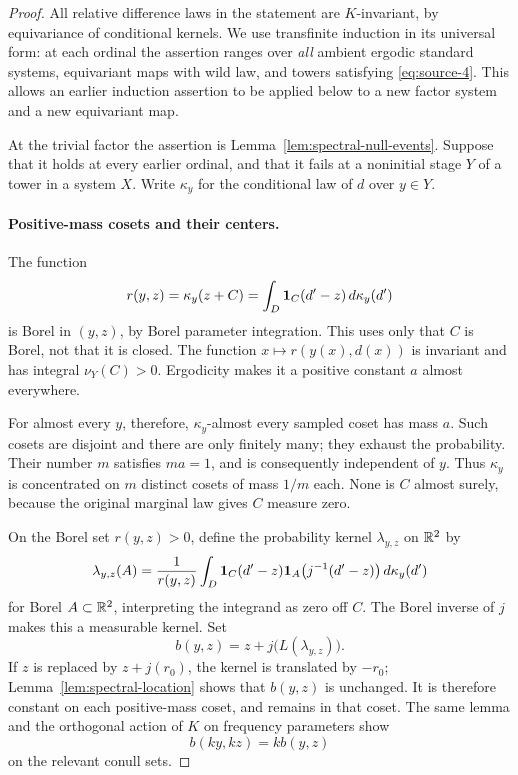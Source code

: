 \begin{proof}
All relative difference laws in the statement are $K$-invariant, by
equivariance of conditional kernels. We use transfinite induction in
its universal form: at each ordinal the assertion ranges over
\emph{all} ambient ergodic standard systems, equivariant maps with wild
law, and towers satisfying \eqref{eq:source-4}. This allows an earlier
induction assertion to be applied below to a new factor system and a
new equivariant map.

At the trivial factor the assertion is
Lemma~\ref{lem:spectral-null-events}. Suppose that it holds at every
earlier ordinal, and that it fails at a noninitial stage $Y$ of a tower
in a system $X$. Write $\kappa_y$ for the conditional law of $d$ over
$y\in Y$.

\paragraph{Positive-mass cosets and their centers.}
The function
\[
 r(y,z)=\kappa_y(z+C)
       =\int_D\mathbf 1_C(d'-z)\,d\kappa_y(d')
\]
is Borel in $(y,z)$, by Borel parameter integration. This uses only that
$C$ is Borel, not that it is closed. The function
$x\mapsto r(y(x),d(x))$ is invariant and has integral $\nu_Y(C)>0$.
Ergodicity makes it a positive constant $a$ almost everywhere.

For almost every $y$, therefore, $\kappa_y$-almost every sampled coset
has mass $a$. Such cosets are disjoint and there are only finitely many;
they exhaust the probability. Their number $m$ satisfies $ma=1$, and
is consequently independent of $y$. Thus $\kappa_y$ is concentrated
on $m$ distinct cosets of mass $1/m$ each. None is $C$ almost surely,
because the original marginal law gives $C$ measure zero.

On the Borel set $r(y,z)>0$, define the probability kernel
$\lambda_{y,z}$ on $\mathbb R^2$ by
\[
 \lambda_{y,z}(A)=\frac{1}{r(y,z)}
 \int_D\mathbf 1_C(d'-z)\mathbf 1_A\bigl(j^{-1}(d'-z)\bigr)
 \,d\kappa_y(d')
\]
for Borel $A\subset\mathbb R^2$, interpreting the integrand as zero off $C$.
The Borel inverse of $j$ makes this a measurable kernel. Set
\[
 b(y,z)=z+j\bigl(L(\lambda_{y,z})\bigr).
\]
If $z$ is replaced by $z+j(r_0)$, the kernel is translated by $-r_0$;
Lemma~\ref{lem:spectral-location} shows that $b(y,z)$ is unchanged.
It is therefore constant on each positive-mass coset, and remains in
that coset. The same lemma and the orthogonal action of $K$ on frequency
parameters show
\[
 b(ky,kz)=k b(y,z)
\]
on the relevant conull sets.


\end{proof}
